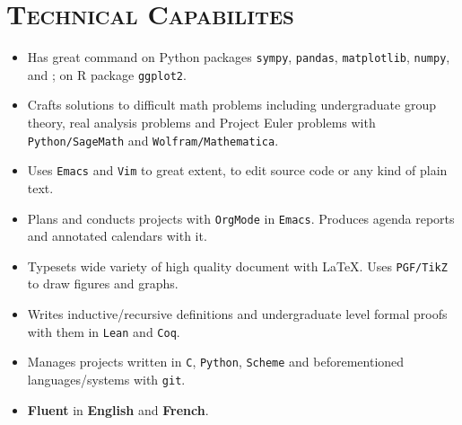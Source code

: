 \documentclass[oneside, 10pt]{memoir}
\begin{document}
\section*{\textsc{Technical Capabilites}}
\begin{itemize}[leftmargin=*]
    \item Has great command on Python packages
        \texttt{sympy},
        \texttt{pandas},
        \texttt{matplotlib},
        \texttt{numpy},
        and
        ;
        on R package
        \texttt{ggplot2}.
    \item Crafts solutions to difficult math problems including undergraduate
        group theory, real analysis problems and Project Euler problems with
        \texttt{Python/SageMath} and \texttt{Wolfram/Mathematica}.
    \item Uses \texttt{Emacs} and \texttt{Vim} to great extent, to edit
        source code or any kind of plain text.
    \item Plans and conducts projects with \texttt{OrgMode} in
        \texttt{Emacs}.
        Produces agenda reports and annotated calendars with it.
    \item Typesets wide variety of high quality document with \LaTeX. Uses
        \texttt{PGF/TikZ} to draw figures and graphs.
    \item Writes inductive/recursive definitions and undergraduate level
        formal proofs with them in \texttt{Lean} and \texttt{Coq}.
    \item Manages projects written in \texttt{C}, \texttt{Python},
        \texttt{Scheme} and beforementioned languages/systems with
        \texttt{git}.
    \item \textbf{Fluent} in \textbf{English} and \textbf{French}.
\end{itemize}
\end{document}
